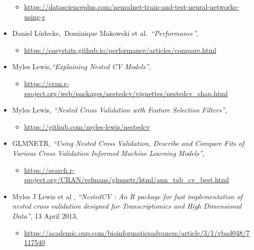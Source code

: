 \documentclass[
]{article}
\providecommand{\tightlist}{%
  \setlength{\itemsep}{0pt}\setlength{\parskip}{0pt}}
\begin{document}
\begin{itemize}
  \begin{itemize}
  \tightlist
  \item
    \url{https://datascienceplus.com/neuralnet-train-and-test-neural-networks-using-r}
  \end{itemize}
\item
  Daniel Lüdecke,~Dominique Makowski et al.~\emph{``Performance''},

  \begin{itemize}
  \tightlist
  \item
    \url{https://easystats.github.io/performance/articles/compare.html}
  \end{itemize}
\item
  Myles Lewis,\emph{``Explaining Nested CV Models''},

  \begin{itemize}
  \tightlist
  \item
    \url{https://cran.r-project.org/web/packages/nestedcv/vignettes/nestedcv_shap.html}
  \end{itemize}
\item
  Myles Lewis, \emph{``Nested Cross Validation with Feature Selection
  Filters''},

  \begin{itemize}
  \tightlist
  \item
    \url{https://github.com/myles-lewis/nestedcv}
  \end{itemize}
\item
  GLMNETR, \emph{``Using Nested Cross Validation, Describe and Compare
  Fits of Various Cross Validation Informed Machine Learning Models''},

  \begin{itemize}
  \tightlist
  \item
    \url{https://search.r-project.org/CRAN/refmans/glmnetr/html/ann_tab_cv_best.html}
  \end{itemize}
\item
  Myles J Lewis et al , \emph{``NestedCV : An R package for fast
  implementation of nested cross validation designed for Transcriptomics
  and High Dimensional Data''}, 13 April 2013,

  \begin{itemize}
  \tightlist
  \item
    \url{https://academic.oup.com/bioinformaticsadvances/article/3/1/vbad048/7117540}
  \end{itemize}
\end{itemize}
\end{document}
